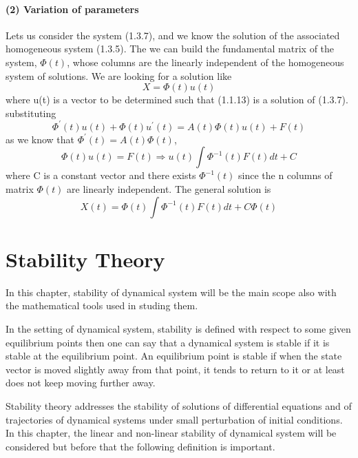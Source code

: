 \documentclass[a4paper,12pt]{report}
\numberwithin{equation}{section}
\begin{document}
\subsubsection*{(2) Variation of parameters}
Lets us consider the system (1.3.7), and we know the solution of the associated homogeneous system (1.3.5). The we can build the fundamental matrix of the system, $\Phi (t)$, whose columns are the linearly independent of the homogeneous system of solutions. We are looking for a solution like
\begin{equation}
X = \Phi (t) u(t)
\end{equation}
where u(t) is a vector to be determined such that (1.1.13) is a solution of (1.3.7). substituting
\begin{equation}
\Phi ^{\prime} (t) u(t) + \Phi (t) u^{\prime} (t) = A(t) \Phi (t) u(t) + F(t)
\end{equation} 
as we know that $ \Phi ^{\prime} (t) = A(t) \Phi (t) $,
\begin{equation}
\Phi (t)u(t) = F(t) \Longrightarrow u(t) \int \Phi ^{-1} (t)F(t)dt + C
\end{equation}
where C is a constant vector and there exists $ \Phi ^{-1} (t)$ since the n columns of matrix $\Phi (t)$ are linearly independent. The general solution is 
\begin{equation}
X(t) = \Phi (t) \int \Phi ^{-1} (t)F(t) dt 
+ C\Phi (t)
\end{equation}
\chapter{Stability Theory}
In this chapter, stability of dynamical system will be the main scope also with the mathematical tools used in studing them.

In the setting of dynamical system, stability is defined with respect to some given equilibrium points then one can say that a dynamical system is stable if it is stable at the equilibrium point. An equilibrium point is stable if when the state vector is moved slightly away from that point, it tends to return to it or at least does not keep moving further away. 

Stability theory addresses the stability of solutions of differential equations and of trajectories of dynamical systems under small perturbation of initial conditions. In this chapter, the linear and non-linear stability of dynamical system will be considered but before that the following definition is important.
\end{document}

